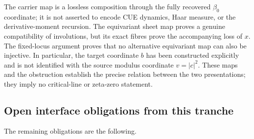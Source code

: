 \begin{remark}
The carrier map is a lossless composition through the fully recovered
$\beta_0$ coordinate; it is not asserted to encode CUE dynamics, Haar measure,
or the derivative-moment recursion.  The equivariant sheet map proves a genuine
compatibility of involutions, but its exact fibres prove the accompanying loss
of $x$.  The fixed-locus argument proves that no alternative equivariant map can
also be injective.  In particular, the target coordinate $b$ has been constructed
explicitly and is not identified with the source modulus coordinate $v=|c|^2$.
These maps and the obstruction establish the precise relation between the two
presentations; they imply no critical-line or zeta-zero statement.
\end{remark}












\subsection{Open interface obligations from this tranche}

The remaining obligations are the following.

